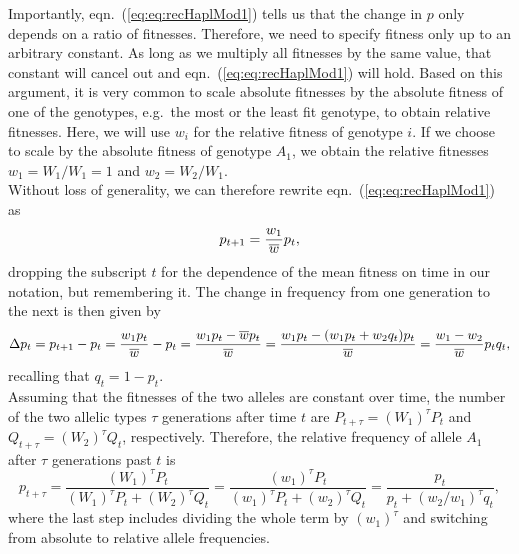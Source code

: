 Importantly, eqn.\ (\ref{eq:eq:recHaplMod1}) tells us that the change in $p$ only depends on a ratio of fitnesses. Therefore, we need to specify fitness only up to an arbitrary constant. As long as we multiply all fitnesses by the same value, that constant will cancel out and eqn.\ (\ref{eq:eq:recHaplMod1}) will hold. Based on this argument, it is very common to scale absolute fitnesses by the absolute fitness of one of the genotypes, e.g.\ the most or the least fit genotype, to obtain relative fitnesses. Here, we will use $w_i$ for the relative fitness of genotype $i$. If we choose to scale by the absolute fitness of genotype $A_1$, we obtain the relative fitnesses $w_1 = W_1/W_1 = 1$ and $w_2 = W_2/W_1$.\\
Without loss of generality, we can therefore rewrite eqn.\ (\ref{eq:eq:recHaplMod1}) as
\begin{equation}
	\label{eq:recHaplMod2}
	p_{t+1} = \frac{w_1}{\overline{w}} p_t,
\end{equation}
dropping the subscript $t$ for the dependence of the mean fitness on time in our notation, but remembering it.
The change in frequency from one generation to the next is then given by
\begin{equation}
\Delta p_t = p_{t+1} - p_t= \frac{ w_1 p_t}{ \overline{w}} - p_t = \frac{w_1 p_t - \overline{w} p_t}{\overline{w}} = \frac{w_1 p_t - (w_1 p_t + w_2 q_t) p_t}{\overline{w}} = \frac{w_1 - w_2}{\overline{w}} p_t q_t,
\label{eq:deltap_haploid}
\end{equation}
recalling that $q_t = 1 - p_t$.\\

Assuming that the fitnesses of the two alleles are constant over time,
the number of the two allelic types $\tau$ generations after time $t$ are
$P_{t+\tau} = (W_1)^{\tau} P_t$ and $Q_{t+\tau}=  (W_2)^{\tau} Q_t$, respectively. Therefore, the relative frequency of allele $A_1$ after $\tau$ generations past $t$ is
\begin{equation}
	p_{t+\tau} = \frac{ (W_1)^{\tau} P_t}{ (W_1)^{\tau} P_t+(W_2)^{\tau} Q_t} = \frac{ (w_1)^{\tau} P_t}{ (w_1)^{\tau} P_t+(w_2)^{\tau} Q_t} = \frac{p_t}{p_t + (w_2/w_1)^{\tau} q_t},
	\label{eq:haploid_tau_gen}
\end{equation}
where the last step includes dividing the whole term by $(w_1)^{\tau}$ and switching from absolute to relative allele frequencies.\\

